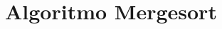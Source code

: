 \section[Algoritmo Mergesort]{Algoritmo Mergesort}
\begin{frame}[plain]
%	
%
%
%
%			
%		
%		
		
\end{frame}
		
\begin{frame}[plain]
%	
%	
	
\end{frame}	